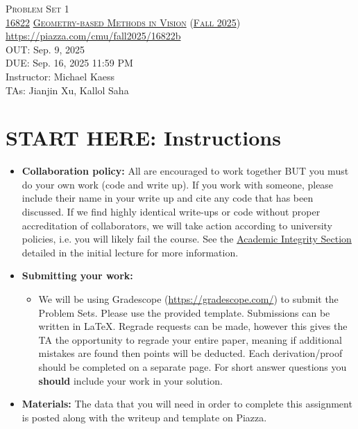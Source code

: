 \documentclass[11pt,addpoints,answers]{exam}
\title{\textsc{\hwName}} %
\author{}
\date{}
\date{}
\numberwithin{equation}{section} %
\numberwithin{figure}{section} %
\numberwithin{table}{section} %
\newcommand{\courseNum}{\href{https://geometric3d.github.io}{16822}}
\newcommand{\courseName}{\href{https://geometric3d.github.io}{Geometry-based Methods in Vision}}
\newcommand{\courseSem}{\href{https://geometric3d.github.io}{Fall 2025}}
\newcommand{\courseUrl}{\url{https://piazza.com/cmu/fall2025/16822b}}
\newcommand{\hwNum}{Problem Set 1}
\newcommand{\hwTopic}{Projective Geometry and Homography }
\newcommand{\outDate}{Sep. 9, 2025}
\newcommand{\dueDate}{Sep. 16, 2025 11:59 PM}
\newcommand{\instructorName}{Michael Kaess}
\newcommand{\taNames}{Jianjin Xu, Kallol Saha}
\begin{document}
\section*{}
\begin{center}
  \textsc{\LARGE \hwNum} \\
  \vspace{1em}
  \textsc{\large \courseNum{} \courseName{} (\courseSem)} \\
  \courseUrl\\
  \vspace{1em}
  OUT: \outDate \\
  DUE: \dueDate \\
  Instructor: \instructorName \\
  TAs: \taNames
\end{center}

\section*{START HERE: Instructions}
\begin{itemize}
\item \textbf{Collaboration policy:} All are encouraged to work together BUT you must do your own work (code and write up). If you work with someone, please include their name in your write up and cite any code that has been discussed. If we find highly identical write-ups or code without proper accreditation of collaborators, we will take action according to university policies, i.e. you will likely fail the course. See the \href{https://www.dropbox.com/s/z6o0tinc9eaez46/L01_Overview.pdf?dl=0}{Academic Integrity Section} detailed in the initial lecture for more information.


\item\textbf{Submitting your work:}

\begin{itemize}

\item We will be using Gradescope (\url{https://gradescope.com/}) to submit the Problem Sets. Please use the provided template. Submissions can be written in LaTeX. Regrade requests can be made, however this gives the TA the opportunity to regrade your entire paper, meaning if additional mistakes are found then points will be deducted.
Each derivation/proof should be  completed on a separate page. For short answer questions you \textbf{should} include your work in your solution.  
\end{itemize}

\item \textbf{Materials:} The data that you will need in order to complete this assignment is posted along with the writeup and template on Piazza.

\end{itemize}
\end{document}
